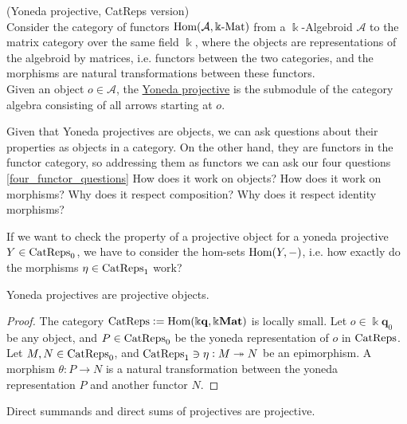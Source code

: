 \begin{definition}{(Yoneda projective, CatReps version)}\label{la:yoneda_projective}\\
Consider the category of functors $\textup{Hom}( \mathcal{A}, \Bbbk\textup{-Mat} )$ from a $\Bbbk$-Algebroid $\mathcal{A}$ to the matrix category
over the same field $\Bbbk$, where the objects are representations of the algebroid by matrices, i.e. functors between the two categories, and
the morphisms are natural transformations between these functors.\\
\noindent Given an object $o \in \mathcal{A}$, the \ul{Yoneda projective} is the submodule of the category algebra consisting of all arrows
starting at $o$.
\end{definition}

Given that Yoneda projectives are objects, we can ask questions about their properties as objects in a category. On the other hand, they are
functors in the functor category, so addressing them as functors we can ask our four questions \ref{four_functor_questions} 
How does it work on objects? How does it work on morphisms? Why does it respect composition? Why does it respect identity morphisms?

If we want to check the property of a projective object for a yoneda projective $Y \in \textup{CatReps}_{0}$, we have to consider the
hom-sets $\textup{Hom}(Y,-)$, i.e. how exactly do the morphisms $\eta \in \textup{CatReps}_{1}$ work?



\begin{lemma}
Yoneda projectives are projective objects.
\begin{proof}
The category $\textup{CatReps} := \textup{Hom}(\Bbbk \mathbf{q}, \Bbbk\mathbf{Mat})$ is locally small.
Let $o \in \Bbbk \mathbf{q}_{0}$ be any object, and $P \in \textup{CatReps}_{0}$ be the yoneda representation of $o$ in $\textup{CatReps}$.
Let $M, N \in \textup{CatReps}_{0}$, and $\textup{CatReps}_{1} \ni \eta : M \twoheadrightarrow N$ be an epimorphism.
A morphism $\theta : P \rightarrow N$ is a natural transformation between the yoneda representation $P$ and another functor $N$.
\end{proof}
\end{lemma}


Direct summands and direct sums of projectives are projective.


